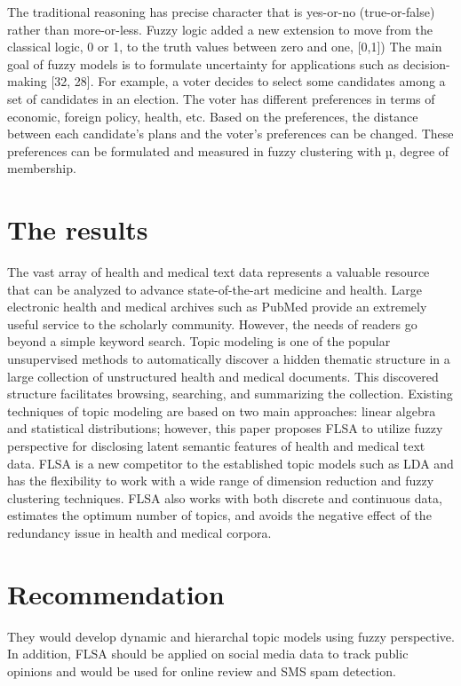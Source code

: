\documentclass[a4paper]{article}
\begin{document}
The traditional reasoning has precise character that is yes-or-no (true-or-false) rather than more-or-less. Fuzzy logic added a new extension to move from the classical logic, 0 or 1, to the truth values between zero and one, [0,1]) The main goal of fuzzy models is to formulate uncertainty for applications such as decision-making [32, 28]. For example, a voter decides to select some candidates among a set of candidates in an election. The voter has different preferences in terms of economic, foreign policy, health, etc. Based on the preferences, the distance between each candidate’s plans and the voter’s preferences can be changed. These preferences can be formulated and measured in fuzzy clustering with µ, degree of membership.

\section{The results}
 
The vast array of health and medical text data represents a valuable resource that can be analyzed to advance state-of-the-art medicine and health. Large electronic health and medical archives such as PubMed provide an extremely useful service to the scholarly community. However, the needs of readers go beyond a simple keyword search. Topic modeling is one of the popular unsupervised methods to automatically discover a hidden thematic structure in a large collection of unstructured health and medical documents. This discovered structure facilitates browsing, searching, and summarizing the collection. Existing techniques of topic modeling are based on two main approaches: linear algebra and statistical distributions; however, this paper proposes FLSA to utilize fuzzy perspective for disclosing latent semantic features of health and medical text data. FLSA is a new competitor to the established topic models such as LDA and has the flexibility to work with a wide range of dimension reduction and fuzzy clustering techniques. FLSA also works with both discrete and continuous data, estimates the optimum number of topics, and avoids the negative effect of the redundancy issue in health and medical corpora. 

\section{Recommendation}

They would develop dynamic and hierarchal topic models using fuzzy perspective. In addition, FLSA should be applied on social media data to track public opinions and would be used for online review and SMS spam detection.
\end{document}
